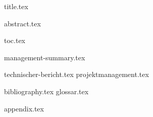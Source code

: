 \documentclass{scrbook}
\begin{document}
	\frontmatter
		{title.tex} 

		\clearpage
		{abstract.tex}

        \clearpage
        {toc.tex}

		{management-summary.tex}


	\mainmatter
		{technischer-bericht.tex}
		{projektmanagement.tex}
		
		{bibliography.tex}
		{glossar.tex}
	
	\cleardoublepage
	\appendix
		{appendix.tex}
	
\end{document}
